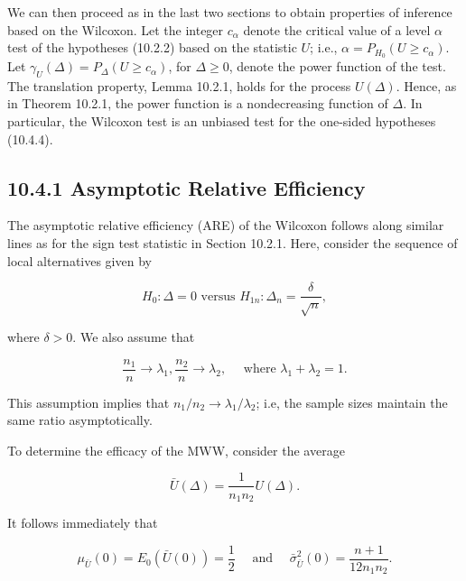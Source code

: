 We can then proceed as in the last two sections to obtain properties of inference based on the Wilcoxon. Let the integer $c_{\alpha}$ denote the critical value of a level $\alpha$ test of the hypotheses (10.2.2) based on the statistic $U$; i.e., $\alpha=P_{H_{0}}\left(U \geq c_{\alpha}\right)$. Let $\gamma_{U}(\Delta)=P_{\Delta}\left(U \geq c_{\alpha}\right)$, for $\Delta \geq 0$, denote the power function of the test. The translation property, Lemma 10.2.1, holds for the process $U(\Delta)$. Hence, as in Theorem 10.2.1, the power function is a nondecreasing function of $\Delta$. In particular, the Wilcoxon test is an unbiased test for the one-sided hypotheses (10.4.4).

\subsection*{10.4.1 Asymptotic Relative Efficiency}
The asymptotic relative efficiency (ARE) of the Wilcoxon follows along similar lines as for the sign test statistic in Section 10.2.1. Here, consider the sequence of local alternatives given by


\begin{equation*}
H_{0}: \Delta=0 \text { versus } H_{1 n}: \Delta_{n}=\frac{\delta}{\sqrt{n}}, \tag{10.4.14}
\end{equation*}


where $\delta>0$. We also assume that


\begin{equation*}
\frac{n_{1}}{n} \rightarrow \lambda_{1}, \frac{n_{2}}{n} \rightarrow \lambda_{2}, \quad \text { where } \lambda_{1}+\lambda_{2}=1 . \tag{10.4.15}
\end{equation*}


This assumption implies that $n_{1} / n_{2} \rightarrow \lambda_{1} / \lambda_{2}$; i.e, the sample sizes maintain the same ratio asymptotically.

To determine the efficacy of the MWW, consider the average


\begin{equation*}
\bar{U}(\Delta)=\frac{1}{n_{1} n_{2}} U(\Delta) . \tag{10.4.16}
\end{equation*}


It follows immediately that


\begin{equation*}
\mu_{\bar{U}}(0)=E_{0}(\bar{U}(0))=\frac{1}{2} \quad \text { and } \quad \bar{\sigma}_{\bar{U}}^{2}(0)=\frac{n+1}{12 n_{1} n_{2}} . \tag{10.4.17}
\end{equation*}


